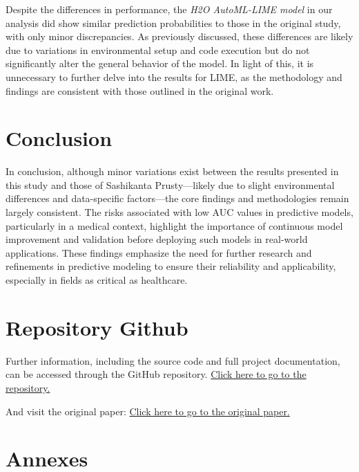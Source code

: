 \documentclass{llncs}
\begin{document}
Despite the differences in performance, the \textit{H2O AutoML-LIME model} in our analysis did show similar prediction probabilities to those in the original study, with only minor discrepancies. As previously discussed, these differences are likely due to variations in environmental setup and code execution but do not significantly alter the general behavior of the model. In light of this, it is unnecessary to further delve into the results for LIME, as the methodology and findings are consistent with those outlined in the original work.


\section{Conclusion}

In conclusion, although minor variations exist between the results presented in this study and those of Sashikanta Prusty—likely due to slight environmental differences and data-specific factors—the core findings and methodologies remain largely consistent. The risks associated with low AUC values in predictive models, particularly in a medical context, highlight the importance of continuous model improvement and validation before deploying such models in real-world applications. These findings emphasize the need for further research and refinements in predictive modeling to ensure their reliability and applicability, especially in fields as critical as healthcare.


\section{Repository Github}
Further information, including the source code and full project documentation, can be accessed through the GitHub repository.  \href{https://github.com/Diegodepab/Predicting_cervical_cancer_risk_probabilities_using_advanced_H20}{Click here to go to the repository.} 

And visit the original paper: \href{https://peerj.com/articles/cs-1916/}{Click here to go to the original paper.} 




\section{Annexes}
\end{document}
